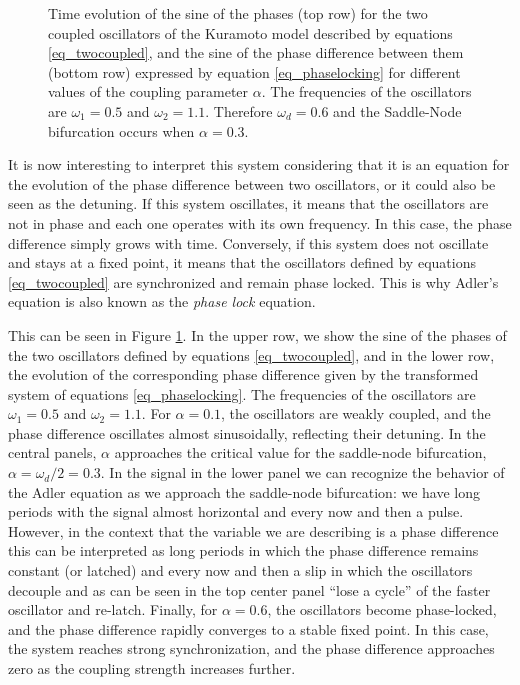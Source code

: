 \documentclass{article}
\begin{document}
\begin{figure} [h]
    \centerline{}
    \caption{Time evolution of the sine of the phases (top row) for the  two coupled oscillators of the Kuramoto model described by equations \ref{eq_twocoupled}, and the sine of the phase difference between them (bottom row) expressed by equation \ref{eq_phaselocking} for different values of the coupling parameter $\alpha$. The frequencies of the oscillators are $\omega_1=0.5$ and $\omega_2=1.1$. Therefore $\omega_d=0.6$ and the Saddle-Node bifurcation occurs when $\alpha=0.3$.
    }
    \label{fig_twocoupled}
\end{figure}

\newpage

It is now interesting to interpret this system considering that it is an equation for the evolution of the phase difference between two oscillators, or it could also be seen as the detuning. 
If this system oscillates, it means that the oscillators are not in phase and each one operates with its own frequency. In this case, the phase difference simply grows with time. 
Conversely, if this system does not oscillate and stays at a fixed point, it means that the oscillators defined by equations \ref{eq_twocoupled} are synchronized and remain phase locked. 
This is why Adler's equation is also known as the {\em phase lock} equation.

This can be seen in Figure \ref{fig_twocoupled}. 
In the upper row, we show the sine of the phases of the two oscillators defined by equations \ref{eq_twocoupled}, and in the lower row, the evolution of the corresponding phase difference given by the transformed system of equations \ref{eq_phaselocking}. The frequencies of the oscillators are $\omega_1=0.5$ and $\omega_2=1.1$. 
For $\alpha = 0.1$, the oscillators are weakly coupled, and the phase difference oscillates almost sinusoidally, reflecting their detuning. 
In the central panels, $\alpha$ approaches the critical value for the saddle-node bifurcation, $\alpha = \omega_d/2 = 0.3$. 
In the signal in the lower panel we can recognize the behavior of the Adler equation as we approach the saddle-node bifurcation: we have long periods with the signal almost horizontal and every now and then a pulse. 
However, in the context that the variable we are describing is a phase difference this can be interpreted as long periods in which the phase difference remains constant (or latched) and every now and then a slip in which the oscillators decouple and as can be seen in the top center panel “lose a cycle” of the faster oscillator and re-latch. 
Finally, for $\alpha = 0.6$, the oscillators become phase-locked, and the phase difference rapidly converges to a stable fixed point. In this case, the system reaches strong synchronization, and the phase difference approaches zero as the coupling strength increases further.
\end{document}
